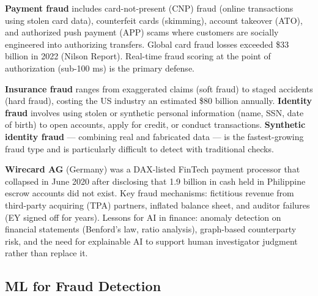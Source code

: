 \begin{tcbitemize}[ skin=sectionraster ]

    \tcbitem[title=Payment and Card Fraud, raster multicolumn=3]
    \textbf{Payment fraud} includes card-not-present (CNP) fraud (online transactions using stolen card data), counterfeit cards (skimming), account takeover (ATO), and authorized push payment (APP) scams where customers are socially engineered into authorizing transfers.
    Global card fraud losses exceeded \$33 billion in 2022 (Nilson Report).
    Real-time fraud scoring at the point of authorization (sub-100 ms) is the primary defense.

    \tcbitem[title={Insurance and Identity Fraud}, raster multicolumn=3]
    \textbf{Insurance fraud} ranges from exaggerated claims (soft fraud) to staged accidents (hard fraud), costing the US industry an estimated \$80 billion annually.
    \textbf{Identity fraud} involves using stolen or synthetic personal information (name, SSN, date of birth) to open accounts, apply for credit, or conduct transactions.
    \textbf{Synthetic identity fraud} — combining real and fabricated data — is the fastest-growing fraud type and is particularly difficult to detect with traditional checks.

    \tcbitem[title=The Wirecard Case, raster multicolumn=6]
    \textbf{Wirecard AG} (Germany) was a DAX-listed FinTech payment processor that collapsed in June 2020 after disclosing that \texteuro{}1.9 billion in cash held in Philippine escrow accounts did not exist.
    Key fraud mechanisms: fictitious revenue from third-party acquiring (TPA) partners, inflated balance sheet, and auditor failures (EY signed off for years).
    Lessons for AI in finance: anomaly detection on financial statements (Benford's law, ratio analysis), graph-based counterparty risk, and the need for explainable AI to support human investigator judgment rather than replace it.

\end{tcbitemize}

\subsection{ML for Fraud Detection}


